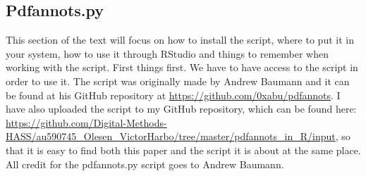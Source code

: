 \documentclass{article}
\begin{document}
\subsection{Pdfannots.py}
This section of the text will focus on how to install the script, where to put it in your system, how to use it through RStudio and things to remember when working with the script. First things first. We have to have access to the script in order to use it. The script was originally made by Andrew Baumann and it can be found at his GitHub repository at \url{https://github.com/0xabu/pdfannots}. I have also uploaded the script to my GitHub repository, which can be found here: \url{https://github.com/Digital-Methods-HASS/au590745_Olesen_VictorHarbo/tree/master/pdfannots_in_R/input}, so that it is easy to find both this paper and the script it is about at the same place. All credit for the pdfannots.py script goes to Andrew Baumann. 
\end{document}
